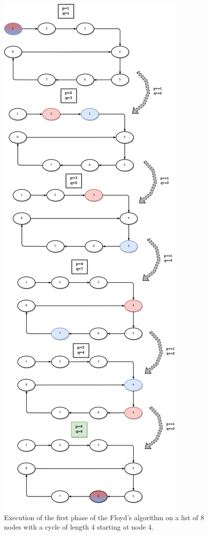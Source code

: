 \begin{figure}[htbp]
	\label{fig:cycle_in_list:flow1}
	\centering
	\includegraphics[scale=0.15]{sources/cycle_in_list/images/flow1}
	\caption{Execution of the first phase of the Floyd's algorithm on a list of $8$ nodes with a cycle of length $4$ starting at node $4$.}
\end{figure}

